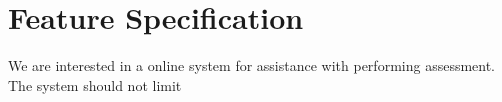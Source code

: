 
\chapter{Feature Specification}

We are interested in a online system for assistance with performing assessment.
The system should not limit












